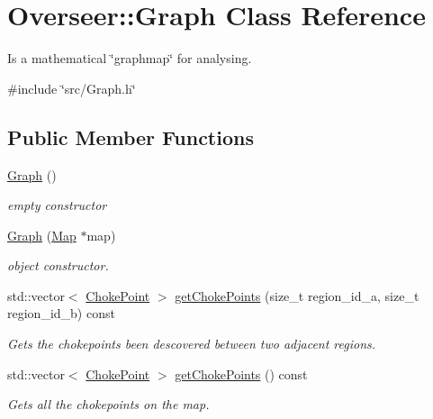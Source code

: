 \hypertarget{classOverseer_1_1Graph}{}\section{Overseer\+:\+:Graph Class Reference}
\label{classOverseer_1_1Graph}


Is a mathematical \char`\"{}graphmap\char`\"{} for analysing.  




{\ttfamily \#include \char`\"{}src/\+Graph.\+h\char`\"{}}

\subsection*{Public Member Functions}
\begin{DoxyCompactItemize}
\item 
\mbox{\label{classOverseer_1_1Graph_a8d8f7394a8403b305682d19e72fe2678}} 
\hyperlink{classOverseer_1_1Graph_a8d8f7394a8403b305682d19e72fe2678}{Graph} ()
\begin{DoxyCompactList}\small\item\em empty constructor \end{DoxyCompactList}\item 
\hyperlink{classOverseer_1_1Graph_af9efde8054cddf829f36a66ff8df5e8b}{Graph} (\hyperlink{classOverseer_1_1Map}{Map} $\ast$map)
\begin{DoxyCompactList}\small\item\em object constructor. \end{DoxyCompactList}\item 
std\+::vector$<$ \hyperlink{classOverseer_1_1ChokePoint}{Choke\+Point} $>$ \hyperlink{classOverseer_1_1Graph_a0d41b814406a8ed2612b7d606670c5cd}{get\+Choke\+Points} (size\+\_\+t region\+\_\+id\+\_\+a, size\+\_\+t region\+\_\+id\+\_\+b) const
\begin{DoxyCompactList}\small\item\em Gets the chokepoints been descovered between two adjacent regions. \end{DoxyCompactList}\item 
std\+::vector$<$ \hyperlink{classOverseer_1_1ChokePoint}{Choke\+Point} $>$ \hyperlink{classOverseer_1_1Graph_a5c40f106b55d259b1168a501f9c35ab3}{get\+Choke\+Points} () const
\begin{DoxyCompactList}\small\item\em Gets all the chokepoints on the map. \end{DoxyCompactList}\item 

\end{DoxyCompactItemize}
